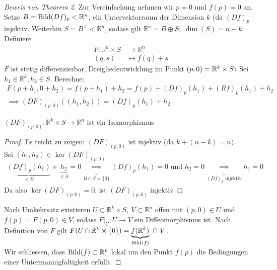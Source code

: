 \documentclass[../main.tex]{subfiles}
\begin{document}
\begin{proof}[Beweis von Theorem 2]
Zur Vereinfachung nehmen wir $p=0$ und $f(p)=0$ an.
Setze $B = \operatorname{Bild}(Df)_p < \mathbb{R}^n$, ein Untervektorraum der Dimension $k$ (da $(Df)_p$ injektiv.
Weiterhin $S = B^{\perp} < \mathbb{R}^n$, sodass gilt $\mathbb{R}^n = B \oplus S, \ \dim (S) = n-k$.
Definiere \begin{align*}
    F : \mathbb{R}^k \times S & \to \mathbb{R}^n \\
    (q,s) & \mapsto f(q) + s
\end{align*}
$F$ ist stetig differenzierbar. Dreigliedentwicklung im Punkt $(p,0)=\mathbb{R}^k \times S \colon \\$
Sei $h_1 \in \mathbb{R}^k, h_2 \in S$. Berechne:
\begin{align*}
    F(p+h_1, 0 + h_2) = f(p+h_1) + h_2 = f(p) + (Df)_p(h_1)+ (Rf)_p(h_1) + h_2 \\
    \implies (DF)_{(p,0)}\left((h_1,h_2)\right) = (Df)_p(h_1) + h_2
\end{align*}
\begin{claim}
$(DF)_{(p,0)} : \mathbb{R}^k \times S \to \mathbb{R}^n$ ist ein Isomorphismus
\end{claim}
\begin{proof}
Es reicht zu zeigen: $(DF)_{(p,0)}$ ist injektiv (da $k + (n-k) = n)$.\\
Sei $(h_1,h_2) \in \ker(DF)_{(p,0)}$
\begin{align*}
    \underbrace{(Df)_p(h_1)}_\textrm{$\in B$} + \underbrace{h_2}_\textrm{$\in S$} = 0 \underbrace{\implies}_\textrm{$B \cap S = \{0\}$} (Df)_p(h_1) = 0 \text{ und } h_2 = 0
    \underbrace{\implies}_\textrm{$(Df)_p$ injektiv} h_1 = 0
\end{align*}
Da also $\ker(DF)_{(p,0)} = 0$, ist $(DF)_{(p,0)}$ injektiv
\end{proof}

Nach Umkehrsatz existieren $U \subset \mathbb{R}^k \times S, \ V \subset \mathbb{R}^n$ offen mit
$(p,0) \in U$ und $f(p) = F(p,0) \in V$, sodass $F\vert_U : U \to V$ ein Diffeomorphismus ist.
Nach Definition von $F$ gilt $F(U \cap \mathbb{R}^k \times \{0\}) =  \underbrace{f(\mathbb{R}^k)}_\textrm{$\bild(f)$} \ \cap \ V$. \\
Wir schliessen, dass $\operatorname{Bild} (f) \subset \mathbb{R}^n$ lokal um den Punkt $f(p)$ die Bedingungen einer Untermannigfaltigkeit erfüllt. 
\end{proof}
\end{document}
